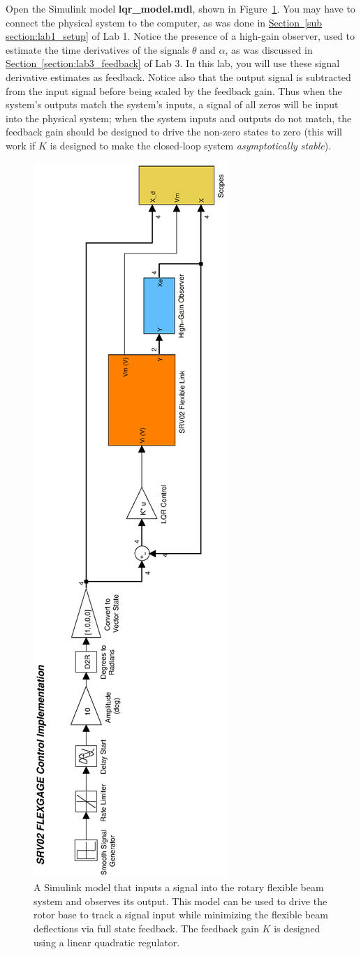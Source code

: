 Open the Simulink model \textbf{lqr\_model.mdl}, shown in Figure~\ref{lab4_lqr_simulink}. You may have to connect the physical system to the computer, as was done in \hyperref[sub section:lab1_setup]{Section~\ref{sub section:lab1_setup}} of Lab 1. Notice the presence of a high-gain observer, used to estimate the time derivatives of the signals $\theta$ and $\alpha$, as was discussed in \hyperref[section:lab3_feedback]{Section~\ref{section:lab3_feedback}} of Lab 3. In this lab, you will use these signal derivative estimates as feedback. Notice also that the output signal is subtracted from the input signal before being scaled by the feedback gain. Thus when the system's outputs match the system's inputs, a signal of all zeros will be input into the physical system; when the system inputs and outputs do not match, the feedback gain should be designed to drive the non-zero states to zero (this will work if $K$ is designed to make the closed-loop system \emph{asymptotically stable}).
\begin{figure}[htb!]
    \includegraphics[width=0.3\linewidth,angle=-90]{eps/lab_4/lqr_simulink}
    \caption{A Simulink model that inputs a signal into the rotary flexible beam system and observes its output. This model can be used to drive the rotor base to track a signal input while minimizing the flexible beam deflections via full state feedback. The feedback gain $K$ is designed using a linear quadratic regulator.}
    \label{lab4_lqr_simulink}
\end{figure}

